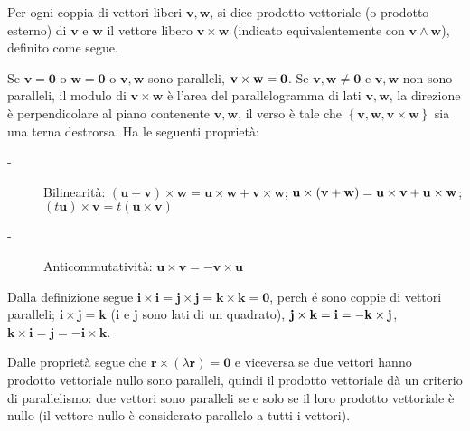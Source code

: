 \documentclass{article}
\begin{document}
Per ogni coppia di vettori liberi $\mathbf{v,w}$, si dice prodotto
vettoriale (o prodotto esterno) di $\mathbf{v}$ e $\mathbf{w}$ il vettore
libero $\mathbf{v\times w}$ (indicato equivalentemente con $\mathbf{v\wedge w%
}$), definito come segue.

Se $\mathbf{v=0}$ o $\mathbf{w=0}$ o $\mathbf{v,w}$ sono paralleli, $\mathbf{%
v\times w=0}$. Se $\mathbf{v,w\neq 0}$ e $\mathbf{v,w}$ non sono paralleli,
il modulo di $\mathbf{v\times w}$ \`{e} l'area del parallelogramma di lati $%
\mathbf{v,w}$, la direzione \`{e} perpendicolare al piano contenente $%
\mathbf{v,w}$, il verso \`{e} tale che $\left\{ \mathbf{v,w,v\times w}%
\right\} $ sia una terna destrorsa. Ha le seguenti propriet\`{a}:

\begin{description}
\item[-] Bilinearit\`{a}: $\left( \mathbf{u}+\mathbf{v}\right) \times 
\mathbf{w=u\times w+v\times w}$; $\mathbf{u}\times \left( \mathbf{v}+\mathbf{%
w}\right) =\mathbf{u\times v+u\times w}$; $\left( t\mathbf{u}\right) \times 
\mathbf{v}=t\left( \mathbf{u\times v}\right) $

\item[-] Anticommutativit\`{a}: $\mathbf{u\times v=-v\times u}$
\end{description}

Dalla definizione segue $\mathbf{i\times i=j\times j=k\times k=0}$, perch%
\'{e} sono coppie di vettori paralleli; $\mathbf{i\times j=k}$ ($\mathbf{i}$
e $\mathbf{j}$ sono lati di un quadrato), $\mathbf{j\times k=i}=-\mathbf{%
k\times j}$, $\mathbf{k\times i=j=-i\times k}$.

Dalle propriet\`{a} segue che $\mathbf{r\times }\left( \lambda \mathbf{r}%
\right) =\mathbf{0}$ e viceversa se due vettori hanno prodotto vettoriale
nullo sono paralleli, quindi il prodotto vettoriale d\`{a} un criterio di
parallelismo: due vettori sono paralleli se e solo se il loro prodotto
vettoriale \`{e} nullo (il vettore nullo \`{e} considerato parallelo a tutti
i vettori).
\end{document}
